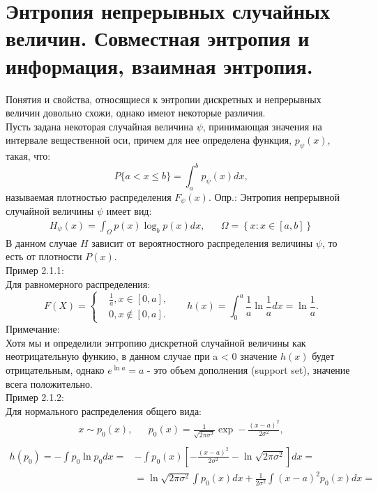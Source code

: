 \documentclass[12pt,a4paper]{scrartcl}
\begin{document}
	\section{Энтропия непрерывных случайных величин. Совместная энтропия и информация, взаимная энтропия.}
	Понятия и свойства, относящиеся к энтропии дискретных и непрерывных величин довольно схожи, однако имеют некоторые различия.\\
	Пусть задана некоторая случайная величина $\psi$, принимающая значения на интервале вещественной оси, причем  для нее определена функция, $p_{\psi}(x)$, такая, что:
	\[
	P \{ a < x \le b \} = \int_{a}^{b} p_{\psi}(x) dx,
	\]
	называемая плотностью распределения $F_{\psi}(x)$.
	Опр.: Энтропия непрерывной случайной величины $\psi$ имеет вид:\\
	\begin{equation}
	\begin{aligned}
		H_{\psi}(x) = \int_{\Omega}^{} p(x) \log_{b} p(x) dx, & & \Omega = \left\{ x : x \in [a, b] \right\}
	\end{aligned}
	\end{equation}
	В данном случае $H$ зависит от вероятностного распределения величины $ \psi $, то есть от плотности $ P(x) $.\\
	Пример 2.1.1:\\
	Для равномерного распределения:\\
	\[
	F(X) = \left\{
	\begin{aligned}
		& \frac{1}{a}, x \in [0, a], &&\\
		& 0, x \notin [0, a]. &&
	\end{aligned}
	\right.
	h(x) = \int_{0}^{a} \frac{1}{a} \ln{\frac{1}{a}} dx = \ln \frac{1}{a}.
	\]
	Примечание:\\
	Хотя мы и определили энтропию дискретной случайной величины как неотрицательную функию, в данном случае при a < 0 значение $h(x)$ будет отрицательным, однако $e^{\ln a} = a$ - это объем дополнения (support set), значение всега положительно.\\
	\linebreak
	Пример 2.1.2:\\
	Для нормального распределения общего вида:\\
	\[
	\begin{aligned}
	 x \sim p_0(x), & & p_0(x) = \frac{1}{\sqrt{ 2 \pi \sigma^2 } }\exp - \frac{(x - a)^2}{2 \sigma^2}, \\
	\end{aligned}
	\]
	\[ 
	\begin{split}
	h(p_0) = - \int p_0 \ln p_0 dx = & - \int p_0(x) \left[ - \frac{(x - a)^2}{2 \sigma^2} - \ln \sqrt{ 2 \pi \sigma^2 } \right] dx = \\
	& = \ln \sqrt{2\pi\sigma^2} \int p_0(x)dx + \frac{1}{2 \sigma^2} \int (x - a)^2 p_0(x)dx =
	\end{split}
	\]
\end{document}
